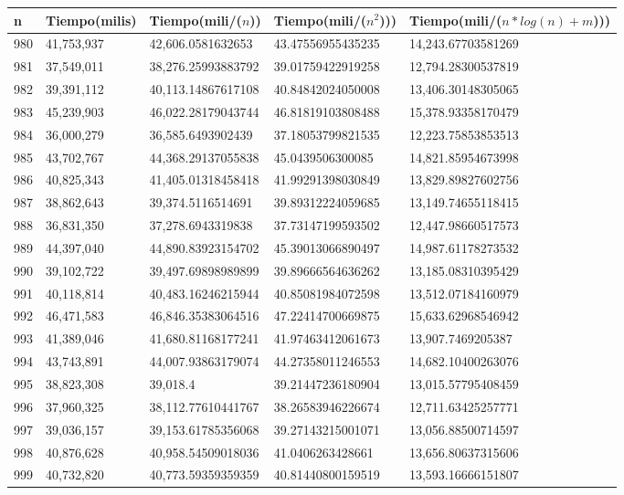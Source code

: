 \begin{table}[H]
\parbox{0.3\textwidth}{
    \begin{tabular}{ | l | l | l | l | l |}
    \hline
n   &Tiempo(milis) &Tiempo(mili/($n$)) &Tiempo(mili/($n^2$))) &Tiempo(mili/($n*log(n) + m$)))\\ \hline
980	&41,753,937	&42,606.0581632653	&43.47556955435235	&14,243.67703581269\\ \hline
981	&37,549,011	&38,276.25993883792	&39.01759422919258	&12,794.28300537819\\ \hline
982	&39,391,112	&40,113.14867617108	&40.84842024050008	&13,406.30148305065\\ \hline
983	&45,239,903	&46,022.28179043744	&46.81819103808488	&15,378.93358170479\\ \hline
984	&36,000,279	&36,585.6493902439	&37.18053799821535	&12,223.75853853513\\ \hline
985	&43,702,767	&44,368.29137055838	&45.0439506300085	&14,821.85954673998\\ \hline
986	&40,825,343	&41,405.01318458418	&41.99291398030849	&13,829.89827602756\\ \hline
987	&38,862,643	&39,374.5116514691	&39.89312224059685	&13,149.74655118415\\ \hline
988	&36,831,350	&37,278.6943319838	&37.73147199593502	&12,447.98660517573\\ \hline
989	&44,397,040	&44,890.83923154702	&45.39013066890497	&14,987.61178273532\\ \hline
990	&39,102,722	&39,497.69898989899	&39.89666564636262	&13,185.08310395429\\ \hline
991	&40,118,814	&40,483.16246215944	&40.85081984072598	&13,512.07184160979\\ \hline
992	&46,471,583	&46,846.35383064516	&47.22414700669875	&15,633.62968546942\\ \hline
993	&41,389,046	&41,680.81168177241	&41.97463412061673	&13,907.7469205387\\ \hline
994	&43,743,891	&44,007.93863179074	&44.27358011246553	&14,682.10400263076\\ \hline
995	&38,823,308	&39,018.4	        &39.21447236180904	&13,015.57795408459\\ \hline
996	&37,960,325	&38,112.77610441767	&38.26583946226674	&12,711.63425257771\\ \hline
997	&39,036,157	&39,153.61785356068	&39.27143215001071	&13,056.88500714597\\ \hline
998	&40,876,628	&40,958.54509018036	&41.0406263428661	&13,656.80637315606\\ \hline
999	&40,732,820	&40,773.59359359359	&40.81440800159519	&13,593.16666151807\\ \hline
    \end{tabular}
}
\end{table}

